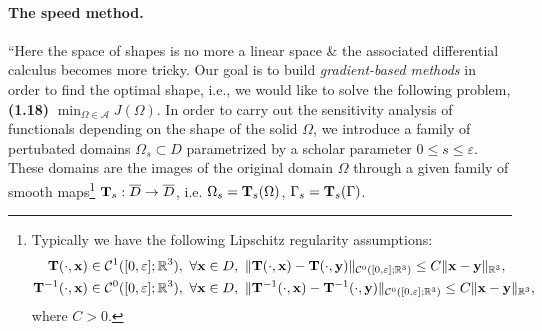 \documentclass[oneside]{book}
\numberwithin{equation}{section}
\begin{document}
\paragraph{The speed method.} ``Here the space of shapes is no more a linear space \& the associated differential calculus becomes more tricky. Our goal is to build \textit{gradient-based methods} in order to find the optimal shape, i.e., we would like to solve the following problem, \textbf{(1.18)} $\min_{\Omega\in\mathcal{A}} J(\Omega)$. In order to carry out the sensitivity analysis of functionals depending on the shape of the solid $\Omega$, we introduce a family of pertubated domains $\Omega_s\subset D$ parametrized by a scholar parameter $0\le s\le\varepsilon$. These domains are the images of the original domain $\Omega$ through a given family of smooth maps\footnote{Typically we have the following Lipschitz regularity assumptions:
\begin{align*}
	{\bf T}(\cdot,{\bf x})&\in\mathcal{C}^1([0,\varepsilon];\mathbb{R}^3),\ \forall{\bf x}\in D,\ \|{\bf T}(\cdot,{\bf x}) - {\bf T}(\cdot,{\bf y})\|_{\mathcal{C}^0([0,\varepsilon];\mathbb{R}^3)}\le C\|{\bf x} - {\bf y}\|_{\mathbb{R}^3},\\
	{\bf T}^{-1}(\cdot,{\bf x})&\in\mathcal{C}^0([0,\varepsilon];\mathbb{R}^3),\ \forall{\bf x}\in D,\ \|{\bf T}^{-1}(\cdot,{\bf x}) - {\bf T}^{-1}(\cdot,{\bf y})\|_{\mathcal{C}^0([0,\varepsilon];\mathbb{R}^3)}\le C\|{\bf x} - {\bf y}\|_{\mathbb{R}^3},
\end{align*}
where $C > 0$.} ${\bf T}_s:\overline{D}\to\overline{D}$, i.e. $\Omega_s = {\bf T}_s(\Omega)$, $\Gamma_s = {\bf T}_s(\Gamma)$.
\end{document}
